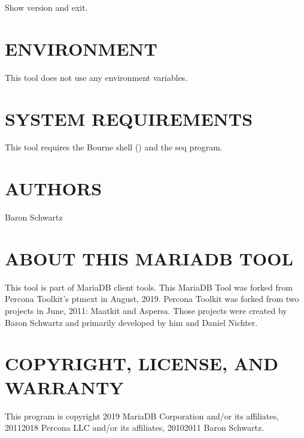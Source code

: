 \documentclass[letterpaper,10pt,english]{sphinxmanual}
\begin{document}
\begin{fulllineitems}
\label{\detokenize{mariadb-status-diff:cmdoption-mariadb-status-diff-version}}
\sphinxAtStartPar
Show version and exit.

\end{fulllineitems}



\section{ENVIRONMENT}
\label{\detokenize{mariadb-status-diff:environment}}
\sphinxAtStartPar
This tool does not use any environment variables.


\section{SYSTEM REQUIREMENTS}
\label{\detokenize{mariadb-status-diff:system-requirements}}
\sphinxAtStartPar
This tool requires the Bourne shell () and the seq program.


\section{AUTHORS}
\label{\detokenize{mariadb-status-diff:authors}}
\sphinxAtStartPar
Baron Schwartz


\section{ABOUT THIS MARIADB TOOL}
\label{\detokenize{mariadb-status-diff:about-this-mariadb-tool}}
\sphinxAtStartPar
This tool is part of MariaDB client tools. This MariaDB Tool was forked from
Percona Toolkit’s pt\sphinxhyphen{}mext in August, 2019. Percona Toolkit was forked from two
projects in June, 2011: Maatkit and Aspersa.  Those projects were created by
Baron Schwartz and primarily developed by him and Daniel Nichter.


\section{COPYRIGHT, LICENSE, AND WARRANTY}
\label{\detokenize{mariadb-status-diff:copyright-license-and-warranty}}
\sphinxAtStartPar
This program is copyright 2019 MariaDB Corporation and/or its affiliates,
2011\sphinxhyphen{}2018 Percona LLC and/or its affiliates, 2010\sphinxhyphen{}2011 Baron Schwartz.
\end{document}
